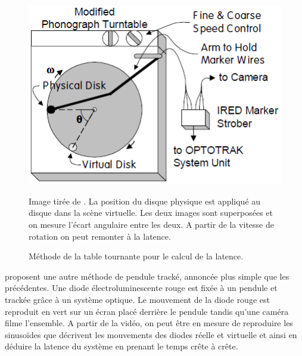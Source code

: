 	\begin{figure}
		\centering
		\includegraphics[scale=.75]{Figures/SwindellsPhonograph}
		\caption{Méthode de la table tournante pour le calcul de la latence.}{Image tirée de \citep{swindells_system_2000}. La position du disque physique est appliqué au disque dans la scène virtuelle. Les deux images sont superposées et on mesure l'écart angulaire entre les deux. A partir de la vitesse de rotation on peut remonter à la latence.}
		\label{fig:swindells_phonograph}
	\end{figure}
	
	\par \citep{steed_simple_2008} proposent une autre méthode de pendule tracké, annoncée plus simple que les précédentes. Une diode électroluminescente rouge est fixée à un pendule et trackée grâce à un système optique. Le mouvement de la diode rouge est reproduit en vert sur un écran placé derrière le pendule tandis qu'une caméra filme l'ensemble. A partir de la vidéo, on peut être en mesure de reproduire les sinusoïdes que décrivent les mouvements des diodes réelle et virtuelle et ainsi en déduire la latence du système en prenant le temps crête à crête.
	
